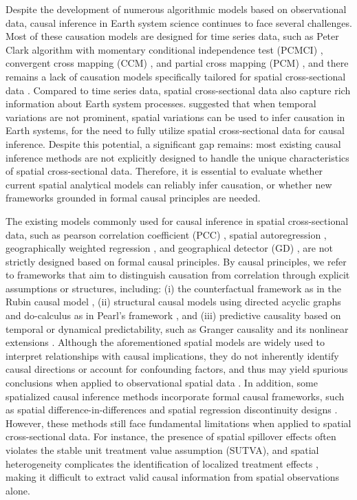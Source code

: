 \documentclass[authoryear,preprint,review,12pt]{elsarticle}
\begin{document}
Despite the development of numerous algorithmic models based on observational data, causal inference in Earth system science continues to face several challenges. Most of these causation models are designed for time series data, such as Peter Clark algorithm with momentary conditional independence test (PCMCI) \citep{runge2019pcmci}, convergent cross mapping (CCM) \citep{sugihara2012ccm}, and partial cross mapping (PCM) \citep{leng2020pcm}, and there remains a lack of causation models specifically tailored for spatial cross-sectional data \citep{gao2022ciss,gao2023gccm}. Compared to time series data, spatial cross-sectional data also capture rich information about Earth system processes. \cite{gao2022tscess} suggested that when temporal variations are not prominent, spatial variations can be used to infer causation in Earth systems, for the need to fully utilize spatial cross-sectional data for causal inference. Despite this potential, a significant gap remains: most existing causal inference methods are not explicitly designed to handle the unique characteristics of spatial cross-sectional data. Therefore, it is essential to evaluate whether current spatial analytical models can reliably infer causation, or whether new frameworks grounded in formal causal principles are needed.

The existing models commonly used for causal inference in spatial cross-sectional data, such as pearson correlation coefficient (PCC) \citep{pearson1895pcc}, spatial autoregression \citep{anselin2013sar}, geographically weighted regression \citep{fotheringham2003gwr,fotheringham2017mgwr}, and geographical detector (GD) \citep{wang2010gd1,lyu2025gdverse}, are not strictly designed based on formal causal principles. By causal principles, we refer to frameworks that aim to distinguish causation from correlation through explicit assumptions or structures, including: (i) the counterfactual framework as in the Rubin causal model \citep{rubin2005pom3}, (ii) structural causal models using directed acyclic graphs and do-calculus as in Pearl’s framework \citep{pearl2018scm4}, and (iii) predictive causality based on temporal or dynamical predictability, such as Granger causality and its nonlinear extensions \citep{granger1969grangertest,schreiber2000te1,sugihara2012ccm}. Although the aforementioned spatial models are widely used to interpret relationships with causal implications, they do not inherently identify causal directions or account for confounding factors, and thus may yield spurious conclusions when applied to observational spatial data \citep{gao2022ciss}. In addition, some spatialized causal inference methods incorporate formal causal frameworks, such as spatial difference-in-differences \citep{delgado2015sdid} and spatial regression discontinuity designs \citep{kolak2019srdd}. However, these methods still face fundamental limitations when applied to spatial cross-sectional data. For instance, the presence of spatial spillover effects often violates the stable unit treatment value assumption (SUTVA), and spatial heterogeneity complicates the identification of localized treatment effects \citep{akbari2021spatialcausality,gao2023gccm}, making it difficult to extract valid causal information from spatial observations alone.
\end{document}
